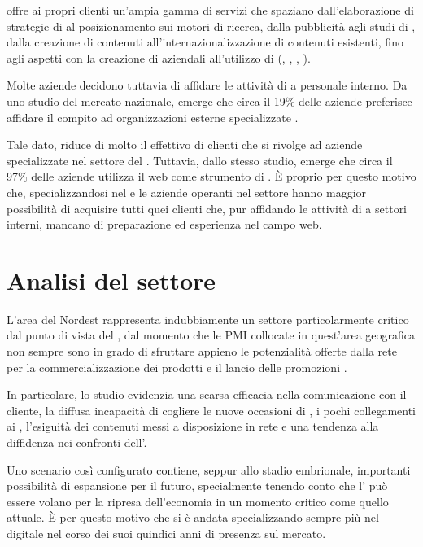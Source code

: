 \customer offre ai propri clienti un'ampia gamma di servizi che spaziano dall'elaborazione di strategie di \mktg al posizionamento sui motori di ricerca, dalla pubblicità  agli studi di , dalla creazione di contenuti all'internazionalizzazione di contenuti esistenti, fino agli aspetti  con la creazione di  aziendali all'utilizzo di  (, , , ).

Molte aziende decidono tuttavia di affidare le attività di \mktg a personale interno. Da uno studio del mercato nazionale, emerge che circa il 19\% delle aziende preferisce affidare il compito ad organizzazioni esterne specializzate \cite{picciaiola:indagine}.

Tale dato, riduce di molto il  effettivo di clienti che si rivolge ad aziende specializzate nel settore del \mktg.
Tuttavia, dallo stesso studio, emerge che circa il 97\% delle aziende utilizza il web come strumento di \mktg. È  proprio per questo motivo che, specializzandosi nel \mktg {} e  le aziende operanti nel settore hanno maggior possibilità di acquisire tutti quei clienti che, pur affidando le attività di \mktg a settori interni,  mancano di preparazione ed esperienza nel campo web.

\section{Analisi del settore}
L'area del Nordest rappresenta indubbiamente un settore particolarmente critico dal punto di vista del \mktg {}, dal momento che le PMI collocate in quest'area geografica non sempre sono in grado di sfruttare appieno le potenzialità offerte dalla rete per la commercializzazione dei prodotti e il lancio delle promozioni \cite[\itshape{}pag. 6 e succ.]{bassi:pmi}.

In particolare, lo studio evidenzia una scarsa efficacia nella comunicazione con il cliente, la diffusa incapacità di cogliere le nuove occasioni di \bsn, i pochi collegamenti ai , l'esiguità dei contenuti messi a disposizione in rete e una tendenza alla diffidenza nei confronti dell'.

Uno scenario così configurato contiene, seppur allo stadio embrionale, importanti possibilità di espansione per il futuro, specialmente tenendo conto che l' può essere volano per la ripresa dell'economia in un momento critico come quello attuale. È per questo motivo che \customer si è andata specializzando sempre più nel \mktg digitale nel corso dei suoi quindici anni di presenza sul mercato.

